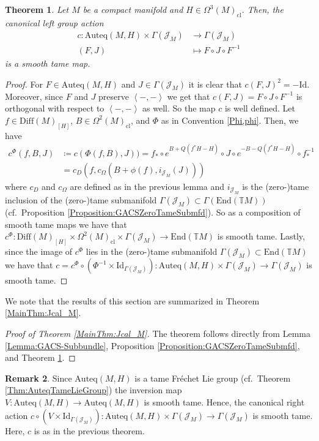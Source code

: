 \documentclass[12pt,a4paper]{article}
\theoremstyle{plain}
\newtheorem{theorem}{Theorem}[subsection]
\theoremstyle{definition}
\newtheorem{remark}[theorem]{Remark}
\newcommand{\scal}[2]{\left\langle #1,#2\right\rangle}
\newcommand{\Forms}[1]{\Omega^{#1}(M)}
\newcommand{\ClForms}[1]{\Forms{#1}_{\mathrm{cl}}}
\newcommand{\SDiff}{\mathrm{Diff}(M)_{[H]}}
\newcommand{\Auteq}{\mathrm{Auteq}(M,H)}
\newcommand{\Id}{\mathrm{Id}}
\newcommand{\GenTM}{\mathbb TM}
\newcommand{\Jcal}{\mathcal{J}}
\begin{document}
\begin{theorem}
\label{Thm:ActionSmTame}
Let $M$ be a compact manifold and $H\in \ClForms{3}$.
Then, the canonical left group action 
\begin{align*}
    c:\Auteq\times \Gamma(\Jcal_M)&\longrightarrow \Gamma(\Jcal_M)\\
    (F,J)&\longmapsto F\circ J\circ F^{-1}
\end{align*}
is a smooth tame map.
\end{theorem}
\begin{proof}
For $F\in \Auteq$ and $J\in \Gamma(\Jcal_M)$ it is clear that $c(F,J)^2=-\mathrm{Id}$. Moreover, since $F$ and $J$ preserve $\scal{-}{-}$ we get that $c(F,J)=F\circ J\circ F^{-1}$ is orthogonal with respect to $\scal{-}{-}$ as well. So the map $c$ is well defined. 
Let $f\in \SDiff$, $B\in \ClForms{2}$, and $\Phi$ as in Convention \ref{Phi,phi}. Then, we have
\begin{align*}
    c^\Phi(f,B,J)&\coloneqq c(\Phi(f,B),J))=f_*\circ e^{B+Q(f^*H-H)}\circ J\circ e^{-B-Q(f^*H-H)}\circ f_*^{-1}\\
    &=c_D(f,c_\Omega(B+\phi(f),i_{\Jcal_M}(J)))
\end{align*}
where $c_D$ and $c_\Omega$ are defined as in the previous lemma and $i_{\Jcal_M}$ is the (zero-)tame inclusion of the (zero-)tame submanifold $\Gamma(\Jcal_M)\subset \Gamma(\mathrm{End}(\GenTM))$ (cf.~Proposition \ref{Proposition:GACSZeroTameSubmfd}).
So as a composition of smooth tame maps we have that 
$c^\Phi:\SDiff\times \ClForms{2}\times \Gamma(\Jcal_M)\to \mathrm{End}(\GenTM)$ is smooth tame. Lastly, since the image of $c^\Phi$ lies in the (zero-)tame submanifold $\Gamma(\Jcal_M)\subset \mathrm{End}(\GenTM)$ we have that $c=c^\Phi\circ (\Phi^{-1}\times \Id_{\Gamma(\Jcal_M)}):\Auteq\times \Gamma(\Jcal_M)\to \Gamma(\Jcal_M)$ is smooth tame.
\end{proof}

We note that the results of this section are summarized in Theorem \ref{MainThm:Jcal_M}.

\begin{proof}[Proof of Theorem \ref{MainThm:Jcal_M}]
    The theorem follows directly from Lemma \ref{Lemma:GACS-Subbundle}, Proposition \ref{Proposition:GACSZeroTameSubmfd}, and Theorem \ref{Thm:ActionSmTame}.
\end{proof}


\begin{remark}
Since $\Auteq$ is a tame Fréchet Lie group (cf.~Theorem \ref{Thm:AuteqTameLieGroup}) the inversion map $V:\Auteq\to \Auteq$ is smooth tame. Hence, the canonical right action $c\circ (V\times \mathrm{Id}_{\Gamma(\Jcal_M)}):\Auteq\times \Gamma(\Jcal_M)\to \Gamma(\Jcal_M)$ is smooth tame. Here, $c$ is as in the previous theorem.
\end{remark}
\end{document}
